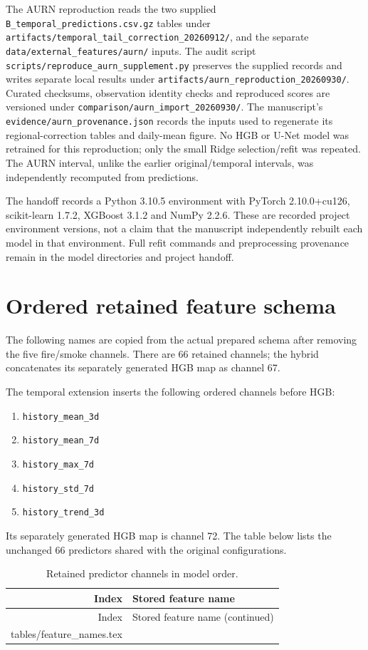 \documentclass[11pt,a4paper]{article}
\makeatletter
\newcommand{\tableinput}[1]{\@@input #1 }
\makeatother
\begin{document}
The AURN reproduction reads the two supplied
\nolinkurl{B_temporal_predictions.csv.gz} tables under
\nolinkurl{artifacts/temporal_tail_correction_20260912/}, and the separate
\nolinkurl{data/external_features/aurn/} inputs. The audit script
\nolinkurl{scripts/reproduce_aurn_supplement.py} preserves the supplied records
and writes separate local results under
\nolinkurl{artifacts/aurn_reproduction_20260930/}. Curated checksums, observation
identity checks and reproduced scores are versioned under
\nolinkurl{comparison/aurn_import_20260930/}. The manuscript's
\nolinkurl{evidence/aurn_provenance.json} records the inputs used to regenerate
its regional-correction tables and daily-mean figure. No HGB or U-Net model
was retrained for this reproduction; only the small Ridge selection/refit was
repeated. The AURN interval, unlike the earlier original/temporal intervals,
was independently recomputed from predictions.

The handoff records a Python 3.10.5 environment with PyTorch 2.10.0+cu126,
scikit-learn 1.7.2, XGBoost 3.1.2 and NumPy 2.2.6. These are recorded project
environment versions, not a claim that the manuscript independently rebuilt
each model in that environment. Full refit commands and preprocessing
provenance remain in the model directories and project handoff.

\section{Ordered retained feature schema}
\label{app:features}
The following names are copied from the actual prepared schema after removing
the five fire/smoke channels. There are 66 retained channels; the hybrid
concatenates its separately generated HGB map as channel 67.

The temporal extension inserts the following ordered channels before HGB:
\begin{enumerate}[start=67]
\item \texttt{history\_mean\_3d}
\item \texttt{history\_mean\_7d}
\item \texttt{history\_max\_7d}
\item \texttt{history\_std\_7d}
\item \texttt{history\_trend\_3d}
\end{enumerate}
Its separately generated HGB map is channel 72. The table below lists the
unchanged 66 predictors shared with the original configurations.
\begingroup
\footnotesize
\renewcommand{\arraystretch}{0.85}
\begin{longtable}{@{}rl@{}}
\caption{Retained predictor channels in model order.}\label{tab:features}\\
\toprule
Index & Stored feature name \\
\midrule
\endfirsthead
\toprule
Index & Stored feature name (continued) \\
\midrule
\endhead
\bottomrule
\endfoot
\tableinput{tables/feature_names.tex}
\end{longtable}
\endgroup

\end{document}
